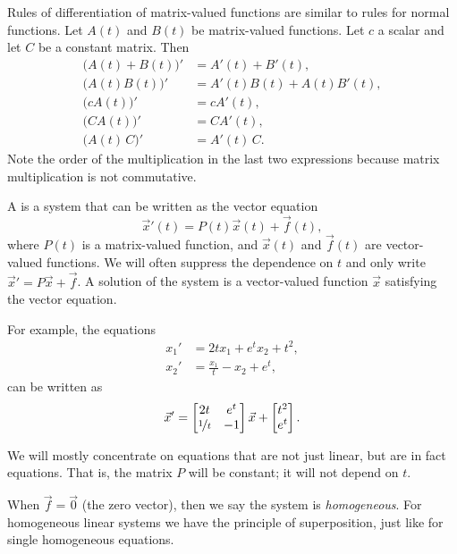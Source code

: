 Rules of differentiation of matrix-valued functions
are similar to rules for normal
functions.  Let $A(t)$ and $B(t)$ be matrix-valued
functions.  Let $c$ a scalar and let $C$ be a constant matrix.
Then
\begin{align*}
\bigl(A(t)+B(t)\bigr)' & = A'(t) + B'(t), \\
\bigl(A(t)B(t)\bigr)' & = A'(t)B(t) + A(t)B'(t), \\
\bigl(cA(t)\bigr)' & = cA'(t), \\
\bigl(CA(t)\bigr)' & = CA'(t), \\
\bigl(A(t)\,C\bigr)' & = A'(t)\,C .
\end{align*}
Note the order of the multiplication in the last two expressions because matrix multiplication is not commutative.

A \emph{} is a system that can be
written as the vector equation
\begin{equation*}
{\vec{x}}'(t) = P(t)\vec{x}(t) + \vec{f}(t),
\end{equation*}
where $P(t)$ is a matrix-valued function,
and $\vec{x}(t)$ and $\vec{f}(t)$ are vector-valued functions.
We will often suppress the dependence on $t$ and
only write ${\vec{x}}' = P\vec{x} + \vec{f}$.  A solution of
the system is a vector-valued function
$\vec{x}$ satisfying the vector equation.

For example, the equations
\begin{align*}
x_1' &= 2t x_1 + e^t x_2 + t^2 , \\
x_2' &= \frac{x_1}{t} -x_2 + e^t ,
\end{align*}
can be written as
\begin{equation*}
{\vec{x}}' = 
\begin{bmatrix}
2t & e^t \\
\nicefrac{1}{t} & -1
\end{bmatrix}
\vec{x}
+
\begin{bmatrix}
t^2 \\
e^t
\end{bmatrix} .
\end{equation*}

We will mostly concentrate on equations that are not just linear, but are in
fact \emph{} equations.  That is, the matrix $P$ will
be constant; it will not depend on $t$.

\medskip

When $\vec{f} = \vec{0}$ (the zero vector), then we say the system is
\emph{homogeneous}.
For homogeneous linear systems we have the
principle of superposition, just like for single homogeneous equations.


